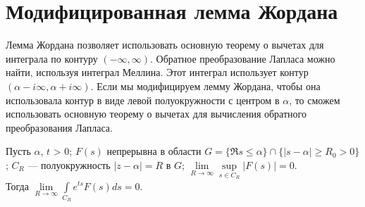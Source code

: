 \documentclass[../paper.tex]{subfile}
\begin{document}
\section {Модифицированная лемма Жордана}
Лемма Жордана позволяет использовать основную теорему о вычетах для интеграла по контуру $(-\infty, \infty)$.
Обратное преобразование Лапласа можно найти, используя интеграл Меллина. Этот интеграл использует контур $(\alpha - i\infty, \alpha + i\infty)$.
Если мы модифицируем лемму Жордана, чтобы она использовала контур в виде левой полуокружности с центром в $\alpha$, то сможем использовать основную теорему о вычетах для вычисления обратного преобразования Лапласа.
%
\begin{Th*} $ $ \\
    Пусть $\alpha$, $t$ > 0; 
    $F(s)$ непрерывна в области $G = \{\Re s \le  \alpha \} \cap \{ |s-\alpha| \ge  R_0 > 0 \}$;
	$C_R$ --- полуокружность $|z-\alpha| = R$ в $G$;
	$\lim\limits_{R \to \infty} \sup\limits_{s \in C_R} |F(s)| = 0$. \\
    Тогда $\lim\limits_{R \to \infty} \int\limits_{C_R} e^{ts} F(s)ds = 0$.
\end{Th*}
\end{document}

